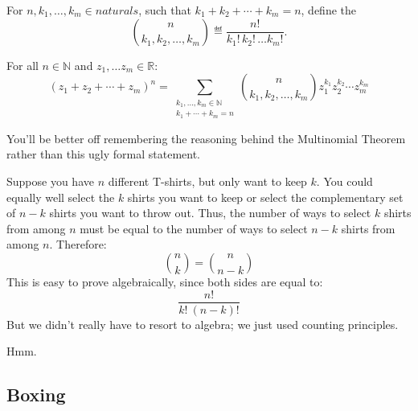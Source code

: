 \begin{definition}
For $n,k_1,\dots,k_m \in naturals$, such that $k_1+k_2+\cdots+k_m = n$,
define the 
\[
\binom{n}{k_1, k_2, \dots, k_m} \eqdef \frac{n!}{k_1!\, k_2!\, \dots k_m!}.
\]
\end{definition}

\begin{theorem}\label{multinom-thm}
For all $n \in \mathbb{N}$ and $z_1, \dots z_m \in \mathbb{R}$:
\[
(z_1 + z_2 + \cdots + z_m)^n =
   \sum_{\substack{k_1, \dots, k_m \in \mathbb{N} \\
                   k_1 + \cdots + k_m = n}}
   \binom{n}{k_1, k_2, \dots, k_m} z_1^{k_1} z_2^{k_2} \cdots z_m^{k_m} 
\]
\end{theorem}
You'll be better off remembering the reasoning behind the Multinomial
Theorem rather than this ugly formal statement.

\begin{problems}

\practiceproblems
{}

\classproblems
{}

\homeworkproblems
{}

\end{problems}


\label{combinatorial_proof_sec}

Suppose you have $n$ different T-shirts, but only want to keep $k$.
You could equally well select the $k$ shirts you want to keep or
select the complementary set of $n - k$ shirts you want to throw out.
Thus, the number of ways to select $k$ shirts from among $n$ must be
equal to the number of ways to select $n - k$ shirts from among $n$.
Therefore:
%
\[
\binom{n}{k} = \binom{n}{n-k}
\]
%
This is easy to prove algebraically, since both sides are equal to:
%
\[
\frac{n!}{k!\ (n-k)!}
\]
%
But we didn't really have to resort to algebra; we just used counting
principles.

Hmm.

\subsection{Boxing}

